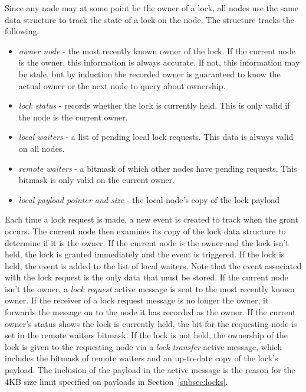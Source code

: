 Since any node may at some point be the owner of a lock, all nodes use the same data structure to track the
state of a lock on the node.
The structure tracks the following:
\begin{itemize} \itemsep1pt \parskip0pt 
\item {\em owner node} - the most recently known owner of the lock.  If the current node is the owner, this
information is always accurate.  If not, this information may be stale, but by induction the recorded 
owner is guaranteed to know the actual owner or the next node to query about ownership.
\item {\em lock status} - records whether the lock is currently held.  This is only valid if the node
is the current owner.
\item {\em local waiters} - a list of pending local lock requests.  This data is always valid on all nodes.
\item {\em remote waiters} - a bitmask of which other nodes have pending requests.  This bitmask is only
valid on the current owner.
\item {\em local payload pointer and size} - the local node's copy of the lock payload
\end{itemize}

Each time a lock request is made, a new event is created to track when the grant occurs.  The current node then
examines its copy of the lock data structure to determine if it is the owner.
If the current node is the owner and the lock isn't
held, the lock is granted immediately and the event is triggered.  If the lock is held, the event is added
to the list of local waiters.  Note that the event associated with
the lock request is the only data that must be stored.
If the current node isn't the owner, a {\em lock request} active message is
sent to the most recently known owner.  If the receiver of a lock request message is no
longer the owner, it forwards the message on to the node it has recorded as the owner.
If the current owner's status shows
the lock is currently held, the bit for the requesting node is set in the remote waiters bitmask.  If the lock is
not held, the ownership of the lock is given to the requesting node via a {\em lock transfer} active
message, which includes the bitmask of remote waiters and an up-to-date copy 
of the lock's payload.  The inclusion of the payload in the active message is the reason for the 
4KB size limit specified on payloads in Section~\ref{subsec:locks}.

